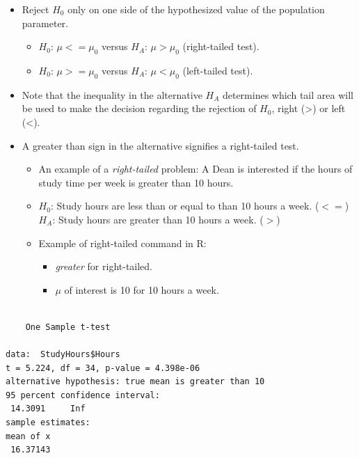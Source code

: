 \documentclass[
  letterpaper,
  DIV=11,
  numbers=noendperiod]{scrreprt}
\newenvironment{Shaded}{\begin{snugshade}}{\end{snugshade}}
\newcommand{\AttributeTok}[1]{\textcolor[rgb]{0.40,0.45,0.13}{#1}}
\newcommand{\DecValTok}[1]{\textcolor[rgb]{0.68,0.00,0.00}{#1}}
\newcommand{\FunctionTok}[1]{\textcolor[rgb]{0.28,0.35,0.67}{#1}}
\newcommand{\NormalTok}[1]{\textcolor[rgb]{0.00,0.23,0.31}{#1}}
\newcommand{\SpecialCharTok}[1]{\textcolor[rgb]{0.37,0.37,0.37}{#1}}
\newcommand{\StringTok}[1]{\textcolor[rgb]{0.13,0.47,0.30}{#1}}
\providecommand{\tightlist}{%
  \setlength{\itemsep}{0pt}\setlength{\parskip}{0pt}}\usepackage{longtable,booktabs,array}
\begin{document}
\begin{itemize}
\item
  Reject \(H_0\) only on one side of the hypothesized value of the
  population parameter.

  \begin{itemize}
  \tightlist
  \item
    \(H_0\): \(\mu <=\mu_0\) versus \(H_A\): \(\mu > \mu_0\)
    (right-tailed test).
  \item
    \(H_0\): \(\mu >=\mu_0\) versus \(H_A\): \(\mu < \mu_0\)
    (left-tailed test).
  \end{itemize}
\item
  Note that the inequality in the alternative \(H_A\) determines which
  tail area will be used to make the decision regarding the rejection of
  \(H_0\), right (\textgreater) or left (\textless).
\item
  A greater than sign in the alternative signifies a right-tailed test.

  \begin{itemize}
  \tightlist
  \item
    An example of a \emph{right-tailed} problem: A Dean is interested if
    the hours of study time per week is greater than 10 hours.
  \item
    \(H_0\): Study hours are less than or equal to than 10 hours a week.
    (\(<=\)) \(H_A\): Study hours are greater than 10 hours a week.
    (\(>\))
  \item
    Example of right-tailed command in R:

    \begin{itemize}
    \tightlist
    \item
      \emph{greater} for right-tailed.
    \item
      \emph{\(\mu\)} of interest is 10 for 10 hours a week.
    \end{itemize}
  \end{itemize}
\end{itemize}

\begin{Shaded}
\end{Shaded}

\begin{verbatim}

    One Sample t-test

data:  StudyHours$Hours
t = 5.224, df = 34, p-value = 4.398e-06
alternative hypothesis: true mean is greater than 10
95 percent confidence interval:
 14.3091     Inf
sample estimates:
mean of x 
 16.37143 
\end{verbatim}
\end{document}
